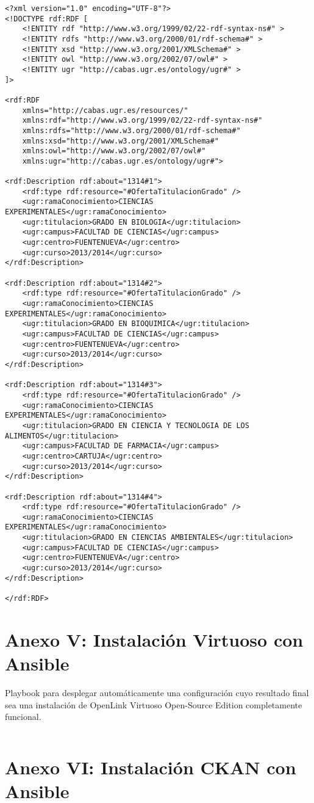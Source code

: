 \begin{verbatim}
<?xml version="1.0" encoding="UTF-8"?>
<!DOCTYPE rdf:RDF [
	<!ENTITY rdf "http://www.w3.org/1999/02/22-rdf-syntax-ns#" >
	<!ENTITY rdfs "http://www.w3.org/2000/01/rdf-schema#" >
	<!ENTITY xsd "http://www.w3.org/2001/XMLSchema#" >
	<!ENTITY owl "http://www.w3.org/2002/07/owl#" >
	<!ENTITY ugr "http://cabas.ugr.es/ontology/ugr#" >
]>

<rdf:RDF
	xmlns="http://cabas.ugr.es/resources/"
	xmlns:rdf="http://www.w3.org/1999/02/22-rdf-syntax-ns#"
	xmlns:rdfs="http://www.w3.org/2000/01/rdf-schema#"
	xmlns:xsd="http://www.w3.org/2001/XMLSchema#"
	xmlns:owl="http://www.w3.org/2002/07/owl#"
	xmlns:ugr="http://cabas.ugr.es/ontology/ugr#">

<rdf:Description rdf:about="1314#1">
	<rdf:type rdf:resource="#OfertaTitulacionGrado" />
	<ugr:ramaConocimiento>CIENCIAS EXPERIMENTALES</ugr:ramaConocimiento>
	<ugr:titulacion>GRADO EN BIOLOGI­A</ugr:titulacion>
	<ugr:campus>FACULTAD DE CIENCIAS</ugr:campus>
	<ugr:centro>FUENTENUEVA</ugr:centro>
	<ugr:curso>2013/2014</ugr:curso>
</rdf:Description>

<rdf:Description rdf:about="1314#2">
	<rdf:type rdf:resource="#OfertaTitulacionGrado" />
	<ugr:ramaConocimiento>CIENCIAS EXPERIMENTALES</ugr:ramaConocimiento>
	<ugr:titulacion>GRADO EN BIOQUI­MICA</ugr:titulacion>
	<ugr:campus>FACULTAD DE CIENCIAS</ugr:campus>
	<ugr:centro>FUENTENUEVA</ugr:centro>
	<ugr:curso>2013/2014</ugr:curso>
</rdf:Description>

<rdf:Description rdf:about="1314#3">
	<rdf:type rdf:resource="#OfertaTitulacionGrado" />
	<ugr:ramaConocimiento>CIENCIAS EXPERIMENTALES</ugr:ramaConocimiento>
	<ugr:titulacion>GRADO EN CIENCIA Y TECNOLOGI­A DE LOS ALIMENTOS</ugr:titulacion>
	<ugr:campus>FACULTAD DE FARMACIA</ugr:campus>
	<ugr:centro>CARTUJA</ugr:centro>
	<ugr:curso>2013/2014</ugr:curso>
</rdf:Description>

<rdf:Description rdf:about="1314#4">
	<rdf:type rdf:resource="#OfertaTitulacionGrado" />
	<ugr:ramaConocimiento>CIENCIAS EXPERIMENTALES</ugr:ramaConocimiento>
	<ugr:titulacion>GRADO EN CIENCIAS AMBIENTALES</ugr:titulacion>
	<ugr:campus>FACULTAD DE CIENCIAS</ugr:campus>
	<ugr:centro>FUENTENUEVA</ugr:centro>
	<ugr:curso>2013/2014</ugr:curso>
</rdf:Description>

</rdf:RDF>
\end{verbatim}

\chapter*{Anexo V: Instalación Virtuoso con Ansible}

{\sf Playbook} para desplegar automáticamente una configuración cuyo resultado final sea una instalación de {\sf OpenLink Virtuoso Open-Source Edition} completamente funcional.

\label{anexo_v}
\inputminted[tabsize=2,breaklines]{yaml}{../../ansible/virtuoso.yml}

\chapter*{Anexo VI: Instalación CKAN con Ansible}
